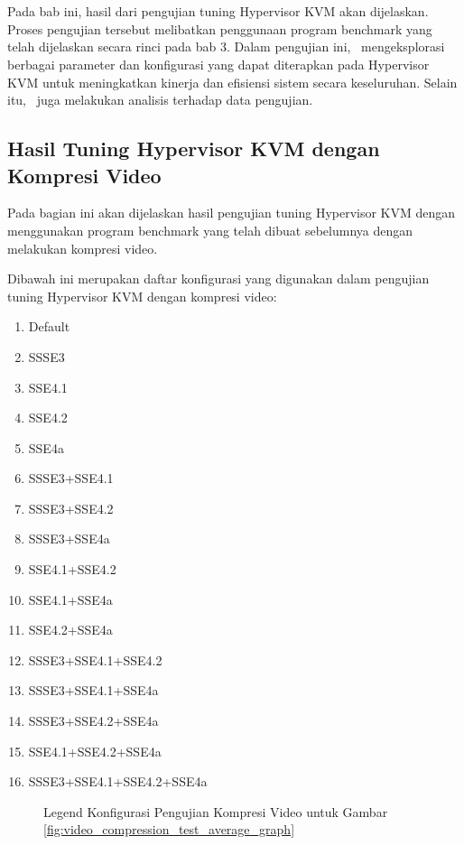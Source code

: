 \chapter{\babEmpat}
Pada bab ini, hasil dari pengujian tuning Hypervisor KVM akan dijelaskan. Proses pengujian tersebut melibatkan penggunaan program benchmark yang telah dijelaskan secara rinci pada bab 3. Dalam pengujian ini, \saya\ mengeksplorasi berbagai parameter dan konfigurasi yang dapat diterapkan pada Hypervisor KVM untuk meningkatkan kinerja dan efisiensi sistem secara keseluruhan. Selain itu, \saya\ juga melakukan analisis terhadap data pengujian.

\section{Hasil Tuning Hypervisor KVM dengan Kompresi Video}
Pada bagian ini akan dijelaskan hasil pengujian tuning Hypervisor KVM dengan menggunakan program benchmark yang telah dibuat sebelumnya dengan melakukan kompresi video.

Dibawah ini merupakan daftar konfigurasi yang digunakan dalam pengujian tuning Hypervisor KVM dengan kompresi video:

\begin{multicols}{2}
    \begin{enumerate}
        \item Default
        \item SSSE3
        \item SSE4.1
        \item SSE4.2
        \item SSE4a
        \item SSSE3+SSE4.1
        \item SSSE3+SSE4.2
        \item SSSE3+SSE4a
        \item SSE4.1+SSE4.2
        \item SSE4.1+SSE4a
        \item SSE4.2+SSE4a
        \item SSSE3+SSE4.1+SSE4.2
        \item SSSE3+SSE4.1+SSE4a
        \item SSSE3+SSE4.2+SSE4a
        \item SSE4.1+SSE4.2+SSE4a
        \item SSSE3+SSE4.1+SSE4.2+SSE4a
    \end{enumerate}
\end{multicols}
\begin{figure}
    \centering
    \caption{Legend Konfigurasi Pengujian Kompresi Video untuk Gambar \ref{fig:video_compression_test_average_graph}}
    \label{fig:video_compression_test_configuration}
\end{figure}

